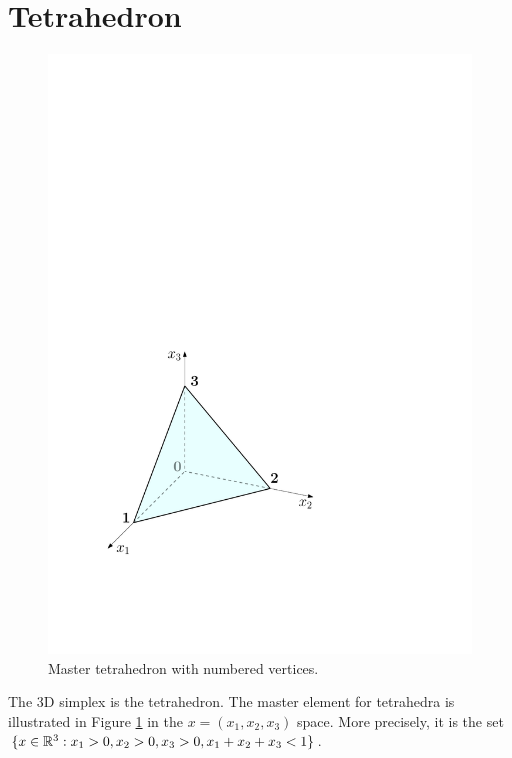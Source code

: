 \section{Tetrahedron}
\label{sec:Tet}

\begin{figure}[!ht]
\begin{center}
\includegraphics[scale=0.5]{./figures/MasterTet.pdf}
\caption{Master tetrahedron with numbered vertices.}
\label{fig:MasterTet}
\end{center}
\end{figure}

The 3D simplex is the tetrahedron. 
The master element for tetrahedra is illustrated in Figure \ref{fig:MasterTet} in the $x=(x_1,x_2,x_3)$ space.
More precisely, it is the set $\{x\in\mathbb{R}^3:x_1>0,x_2>0,x_3>0,x_1+x_2+x_3<1\}$.

